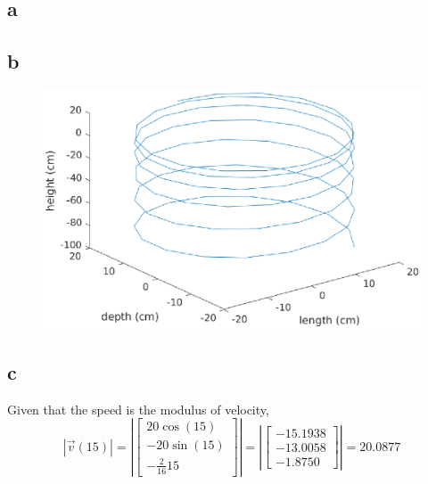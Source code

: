 \subsection{a}


\subsection{b}
\begin{figure}[h]
    \centering
    \includegraphics[scale=0.7, center]{./eps/topic3_b.eps}
    \caption{}
    \label{fig:Topic3-b}
\end{figure}


\subsection{c}
Given that the speed is the modulus of velocity,
\begin{equation}
        \left| \overrightarrow{v}(15) \right| = \left| \begin{bmatrix}
            20\cos(15)\\ -20\sin(15) \\ -\frac{2}{16}15
        \end{bmatrix} \right|
        =
        \left| \begin{bmatrix}
        -15.1938 \\ -13.0058 \\ -1.8750
        \end{bmatrix} \right|
        =
        20.0877
\end{equation}

